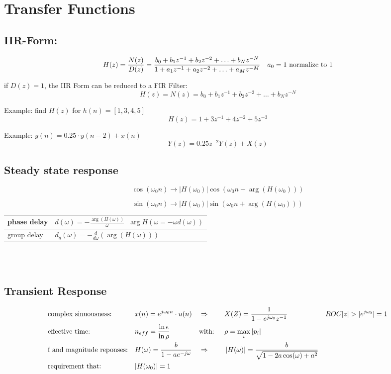 \section{Transfer Functions}
\subsection{IIR-Form:}
\begin{align}
H(z) = \frac{N(z)}{D(z)}
		= \frac{b_0 + b_1 z^{-1} + b_2 z^{-2} + \ldots + b_N z^{-N}}{1 + a_1 z^{-1} + a_2 z^{-2} + \ldots + a_M z^{-M} } && a_0 = 1 \text{ normalize to } 1 \notag
\end{align}

if $D(z) = 1$, the IIR Form can be reduced to a FIR Filter:
\[
	H(z) = N(z) = b_0 + b_1 z^{-1} + b_2 z^{-2} + \ldots + b_N z^{-N}
\]

Example: find $H(z)$ for $h(n) = \left[1,3,4,5\right]$
\[ H(z) = 1 + 3z^{-1} + 4z^{-2} + 5z^{-3}\]

Example: $y(n) = 0.25 \cdot y(n-2) + x(n) $
\[
	Y(z) = 0.25z^{-2}Y(z) + X(z)
\]

\subsection{Steady state response}
\[\cos(\omega_0 n) \rightarrow \left|H(\omega_0) \right| \cos(\omega_0 n + \arg(H(\omega_0))) \]

\[\sin(\omega_0 n) \rightarrow \left|H(\omega_0) \right| \sin(\omega_0 n + \arg(H(\omega_0))) \]

\begin{tabularx}{0.6\textwidth}{|l|X|}
	\hline
	phase delay & $d(\omega) = - \frac{\arg(H(\omega))}{\omega}$\ \qquad $\arg H(\omega = -\omega d(\omega))$
	\\ \hline 
	group delay & $d_g(\omega) = -\frac{d}{d\omega}(\arg(H(\omega)))$	
	\\ \hline
\end{tabularx}\\ \\

\subsection{Transient Response}
\begin{align}
&\text{complex sinuousness:} & & x(n) = e^{j \omega_0 n} \cdot u(n) && \Rightarrow && X(Z) = \frac{1}{1-e^{j \omega_0} z^{-1}} && ROC |z| > |e^{j\omega_0}|=1\notag\\ 
&\text{effective time:} && n_{eff} = \frac{\ln \epsilon}{\ln \rho} &&\text{with: }& &\rho = \max\limits_{i}\left|p_i \right| &&\notag\\
&\text{f and magnitude reponses:} && H(\omega)=\frac{b}{1-ae^{-j\omega}} &&\Rightarrow &&
\left| H(\omega)\right| = \frac{b}{\sqrt{1-2a\cos(\omega) + a^2}} &&\notag\\
&\text{requirement that:} && |H(\omega_0)|=1 &&&& &&\notag
\end{align}\\


